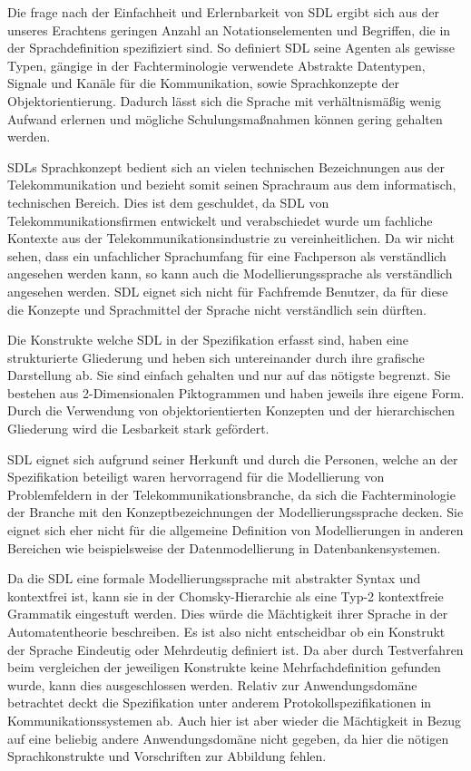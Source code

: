 Die frage nach der Einfachheit und Erlernbarkeit von \ac{SDL} ergibt sich aus der unseres Erachtens geringen Anzahl an Notationselementen und Begriffen, die in der Sprachdefinition spezifiziert sind. So definiert \ac{SDL} seine Agenten als gewisse Typen, gängige in der Fachterminologie verwendete Abstrakte Datentypen, Signale und Kanäle für die Kommunikation, sowie Sprachkonzepte der Objektorientierung. Dadurch lässt sich die Sprache mit verhältnismäßig wenig Aufwand erlernen und mögliche Schulungsmaßnahmen können gering gehalten werden.

\ac{SDL}s Sprachkonzept bedient sich an vielen technischen Bezeichnungen aus der Telekommunikation und bezieht somit seinen Sprachraum aus dem informatisch, technischen Bereich. Dies ist dem geschuldet, da \ac{SDL} von Telekommunikationsfirmen  entwickelt und verabschiedet wurde um fachliche Kontexte aus der Telekommunikationsindustrie zu vereinheitlichen. Da wir nicht sehen, dass ein unfachlicher Sprachumfang für eine Fachperson als verständlich angesehen werden kann, so kann auch die Modellierungssprache als verständlich angesehen werden. \ac{SDL} eignet sich nicht für Fachfremde Benutzer, da für diese die Konzepte und Sprachmittel der Sprache nicht verständlich sein dürften. 

Die Konstrukte welche \ac{SDL} in der Spezifikation erfasst sind, haben eine strukturierte Gliederung und heben sich untereinander durch ihre grafische Darstellung ab. Sie sind einfach gehalten und nur auf das nötigste begrenzt. Sie bestehen aus 2-Dimensionalen Piktogrammen und haben jeweils ihre eigene Form. Durch die Verwendung von objektorientierten Konzepten und der hierarchischen Gliederung wird die Lesbarkeit stark gefördert.

\ac{SDL} eignet sich aufgrund seiner Herkunft und durch die Personen, welche an der Spezifikation beteiligt waren hervorragend für die Modellierung von Problemfeldern in der Telekommunikationsbranche, da sich die Fachterminologie der Branche mit den Konzeptbezeichnungen der Modellierungssprache decken. Sie eignet sich eher nicht für die allgemeine Definition von Modellierungen in anderen Bereichen wie beispielsweise der Datenmodellierung in Datenbankensystemen.

Da die \ac{SDL} eine formale Modellierungssprache mit abstrakter Syntax und kontextfrei ist, kann sie in der Chomsky-Hierarchie als eine Typ-2 kontextfreie Grammatik eingestuft werden. Dies würde die Mächtigkeit ihrer Sprache in der Automatentheorie beschreiben. Es ist also nicht entscheidbar ob ein Konstrukt der Sprache Eindeutig oder Mehrdeutig definiert ist. Da aber durch Testverfahren beim vergleichen der jeweiligen Konstrukte keine Mehrfachdefinition gefunden wurde, kann dies ausgeschlossen werden. Relativ zur Anwendungsdomäne betrachtet deckt die Spezifikation unter anderem Protokollspezifikationen in Kommunikationssystemen ab. Auch hier ist aber wieder die Mächtigkeit in Bezug auf eine beliebig andere Anwendungsdomäne nicht gegeben, da hier die nötigen Sprachkonstrukte und Vorschriften zur Abbildung fehlen. 

